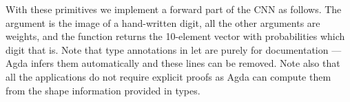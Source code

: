With these primitives we implement a forward part of the CNN
as follows.  The  argument is the image of a hand-written digit, all
the other arguments are weights, and the function returns the 10-element vector
with probabilities which digit that is.  Note that type annotations in let are
purely for documentation --- Agda infers them automatically and these lines
can be removed.  Note also that all the  applications do not require
explicit proofs as Agda can compute them from the shape information provided
in types.
\begin{code}%
%
\>[2]%
\>[1733I]\AgdaSymbol{:}\AgdaSpace{}%
\AgdaSymbol{(}%
\>[18]\AgdaSymbol{:}%
\>[21]\AgdaSpace{}%
\AgdaSymbol{(}\AgdaSpace{}%
\AgdaSpace{}%
\AgdaSpace{}%
\AgdaSpace{}%
\AgdaInductiveConstructor{[]}\AgdaSymbol{)}\AgdaSpace{}%
\AgdaSymbol{)}\AgdaSpace{}%
\AgdaSpace{}%
\AgdaSymbol{(}\AgdaSpace{}%
\AgdaSymbol{:}\AgdaSpace{}%
\AgdaSpace{}%
\AgdaSymbol{(}\AgdaSpace{}%
\AgdaSpace{}%
\AgdaSpace{}%
\AgdaSpace{}%
\AgdaSpace{}%
\AgdaSpace{}%
\AgdaInductiveConstructor{[]}\AgdaSymbol{)}\AgdaSpace{}%
\AgdaSymbol{)}\<%
\\
\>[.][@{}l@{}]\<[1733I]%
\>[10]\AgdaSpace{}%
\AgdaSymbol{(}%
\>[18]\AgdaSymbol{:}%
\>[21]\AgdaSpace{}%
\AgdaSymbol{(}%
\>[28]\AgdaSpace{}%
\AgdaInductiveConstructor{[]}\AgdaSymbol{)}\AgdaSpace{}%
\AgdaSymbol{)}%
\>[42]\AgdaSpace{}%
\AgdaSymbol{(}\AgdaSpace{}%
\AgdaSymbol{:}\AgdaSpace{}%
\AgdaSpace{}%
\AgdaSymbol{(}\AgdaSpace{}%
\AgdaSpace{}%
\AgdaSpace{}%
\AgdaSpace{}%
\AgdaSpace{}%
\AgdaSpace{}%
\AgdaSpace{}%
\AgdaSpace{}%
\AgdaInductiveConstructor{[]}\AgdaSymbol{)}\AgdaSpace{}%
\AgdaSymbol{)}\<%
\\
%

\end{code}

